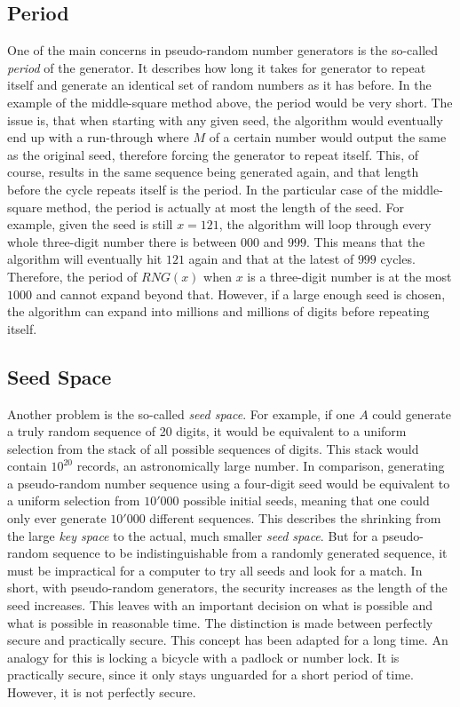 \subsection{Period}
One of the main concerns in pseudo-random number generators is the so-called \emph{period} of the generator.
It describes how long it takes for generator to repeat itself and generate an identical set of random numbers as it has before.
\newline
In the example of the middle-square method above, the period would be very short.
The issue is, that when starting with any given seed, the algorithm would eventually end up with a run-through where $M$ of a certain number would output the same as the original seed, therefore forcing the generator to repeat itself.
This, of course, results in the same sequence being generated again, and that length before the cycle repeats itself is the period.
\emptyline
In the particular case of the middle-square method, the period is actually at most the length of the seed.
For example, given the seed is still $x = 121$, the algorithm will loop through every whole three-digit number there is between $000$ and $999$.
This means that the algorithm will eventually hit $121$ again and that at the latest of $999$ cycles. 
Therefore, the period of $RNG(x)$ when $x$ is a three-digit number is at the most $1000$ and cannot expand beyond that.
\newline
However, if a large enough seed is chosen, the algorithm can expand into millions and millions of digits before repeating itself.

\subsection{Seed Space}
Another problem is the so-called \emph{seed space}.
For example, if one $A$ could generate a truly random sequence of 20 digits, it would be equivalent to a uniform selection from the stack of all possible sequences of digits.
This stack would contain $10^20$ records, an astronomically large number.
In comparison, generating a pseudo-random number sequence using a four-digit seed would be equivalent to a uniform selection from $10'000$ possible initial seeds, meaning that one could only ever generate $10'000$ different sequences.
This describes the shrinking from the large \emph{key space} to the actual, much smaller \emph{seed space}. 
But for a pseudo-random sequence to be indistinguishable from a randomly generated sequence, it must be impractical for a computer to try all seeds and look for a match.
In short, with pseudo-random generators, the security increases as the length of the seed increases. 
\newline
This leaves with an important decision on what is possible and what is possible in reasonable time. The distinction is made between perfectly secure and practically secure.
This concept has been adapted for a long time. An analogy for this is locking a bicycle with a padlock or number lock. It is practically secure, since it only stays unguarded for a short period of time. However, it is not perfectly secure.